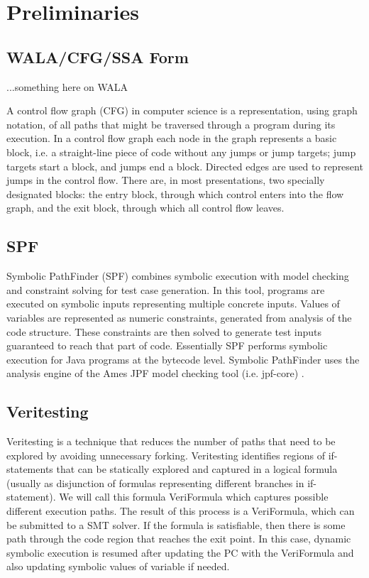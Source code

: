 \section{Preliminaries}

\subsection{WALA/CFG/SSA Form}
...something here on WALA

A control flow graph (CFG) in computer science is a representation, using graph notation, of all paths that might be traversed through a program during its execution.
In a control flow graph each node in the graph represents a basic block, i.e. a straight-line piece of code without any jumps or jump targets; jump targets start a block, and jumps end a block. Directed edges are used to represent jumps in the control flow. There are, in most presentations, two specially designated blocks: the entry block, through which control enters into the flow graph, and the exit block, through which all control flow leaves.

\subsection{SPF}
Symbolic PathFinder (SPF) \cite{spf} combines symbolic execution with model checking and constraint solving for test case generation. In this tool, programs are executed on symbolic inputs representing multiple concrete inputs. Values of variables are represented as numeric constraints, generated from analysis of the code structure. These constraints are then solved to generate test inputs guaranteed to reach that part of code. Essentially SPF performs symbolic execution for Java programs at the bytecode level. Symbolic PathFinder uses the analysis engine of the Ames JPF model checking tool (i.e. jpf-core) \cite{jpf}.


\subsection{Veritesting}
Veritesting\cite{veritesting} is a technique that reduces the number of paths that need to be explored by avoiding unnecessary forking.
%
Veritesting identifies regions of if-statements that can be statically explored and captured in a logical formula (usually as disjunction of formulas representing different branches in if-statement).
%
We will call this formula VeriFormula which captures possible different execution paths.
%
The result of this process is a VeriFormula, which can be submitted to a SMT solver.
%
If the formula is satisfiable, then there is some path through the code region that reaches the exit point. In this case, dynamic symbolic execution is resumed after updating the PC with the VeriFormula and also updating symbolic values of variable if needed.

